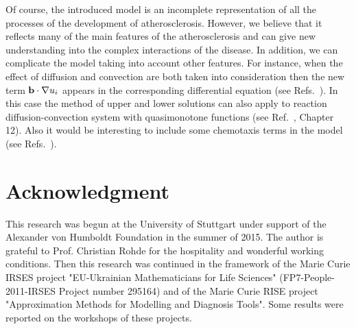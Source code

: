 \documentclass[reqno]{amsart}            %
\numberwithin{equation}{section}
\begin{document}
Of course, the introduced model is an incomplete representation of all the processes of the development of atherosclerosis. However, we believe that it reflects many of the main features of the  atherosclerosis and can give new understanding into the complex interactions of the disease.
In addition, we can complicate the model taking into account other features. For instance, when the effect of diffusion and convection are both taken into consideration then the new term ${\bf b}\cdot \nabla u_i$ appears in the corresponding differential equation (see Refs.~\cite{Banks,Fowler}).
In this case the method of upper and lower solutions can also apply to reaction diffusion-convection system with quasimonotone functions
(see Ref.~\cite{Pao}, Chapter 12). Also it would be interesting to include some chemotaxis terms in the model (see Refs.~\cite{Bel_chemotaxis,Jaeger_chemotaxis,Keller_Segel,Murray-2}).





\section*{Acknowledgment}
This research was begun at the University of Stuttgart under support of the Alexander von Humboldt Foundation in the summer of 2015.
The author  is grateful to Prof. Christian Rohde for the hospitality and wonderful working conditions. Then this research was continued
in the framework of the Marie Curie IRSES project "EU-Ukrainian Mathematicians for Life Sciences" (FP7-People-2011-IRSES Project
number 295164) and of the  Marie Curie RISE project "Approximation Methods for Modelling and Diagnosis Tools".
Some results were reported on the workshops of these projects.
\end{document}
